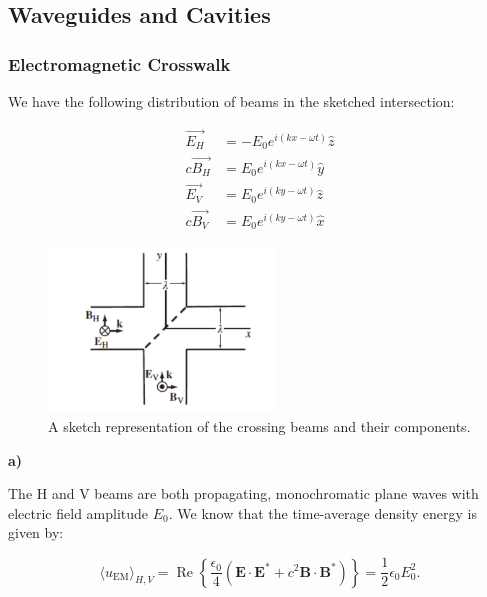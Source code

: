 \subsection{Waveguides and Cavities}

\subsubsection{Electromagnetic Crosswalk}\label{Electromagnetic Crosswalk}

We have the following distribution of beams in the sketched intersection:

\begin{subequations}
	\begin{align}
		\vec{E_{H}} &= -E_{0} e^{i(kx - \omega t)} \hat{z}\\
		c \vec{B_{H}} &= E_{0} e^{i(kx - \omega t)} \hat{y}\\
		\vec{E_{V}} &= E_{0} e^{i(ky - \omega t)} \hat{z}\\
		c \vec{B_{V}} &= E_{0} e^{i(ky - \omega t)} \hat{x}
	\end{align}
\end{subequations}

\begin{figure}[h!]
	\includegraphics[width=6cm]{figures/crossbeams.png}
	\centering
	\caption{A sketch representation of the crossing beams and their components.}
\end{figure}

\textbf{a)}

The $\mathrm{H}$ and $\mathrm{V}$ beams are both propagating, monochromatic plane waves with electric field amplitude $E_{0}$. We know that the time-average density energy is given by:

\begin{equation}
	\langle u_{\mathrm{EM}} \rangle _{H, V}= \operatorname{Re}\left\{\frac{\epsilon_{0}}{4}\left(\mathbf{E} \cdot \mathbf{E}^{*}+c^{2} \mathbf{B} \cdot \mathbf{B}^{*}\right)\right\}=\frac{1}{2} \epsilon_{0} E_{0}^{2}.
\end{equation}

